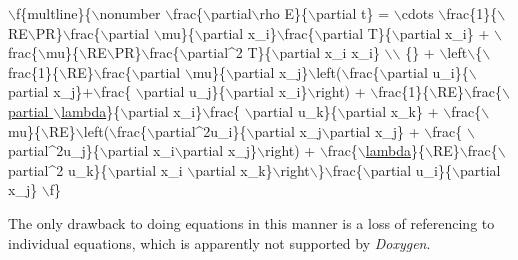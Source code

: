\begin{DoxyCode}
\(\backslash\)f\{multline\}\{\(\backslash\)nonumber
\(\backslash\)frac\{\(\backslash\)partial\(\backslash\)rho E\}\{\(\backslash\)partial t\} = \(\backslash\)cdots \(\backslash\)frac\{1\}\{\(\backslash\)RE\(\backslash\)PR\}\(\backslash\)frac\{\(\backslash\)partial \(\backslash\)mu\}\{\(\backslash\)partial x\_i\}\(\backslash\)frac\{\(\backslash\)partial 
      T\}\{\(\backslash\)partial x\_i\} + \(\backslash\)frac\{\(\backslash\)mu\}\{\(\backslash\)RE\(\backslash\)PR\}\(\backslash\)frac\{\(\backslash\)partial^2 T\}\{\(\backslash\)partial x\_i x\_i\} \(\backslash\)\(\backslash\)
\{\} + \(\backslash\)left\(\backslash\)\{\(\backslash\)frac\{1\}\{\(\backslash\)RE\}\(\backslash\)frac\{\(\backslash\)partial \(\backslash\)mu\}\{\(\backslash\)partial x\_j\}\(\backslash\)left(\(\backslash\)frac\{\(\backslash\)partial u\_i\}\{\(\backslash\)partial x\_j\}+\(\backslash\)frac\{
      \(\backslash\)partial u\_j\}\{\(\backslash\)partial x\_i\}\(\backslash\)right) + \(\backslash\)frac\{1\}\{\(\backslash\)RE\}\(\backslash\)frac\{\hyperlink{RoeKernels_8H_a89211c91f7e80725e4791ef58e043244}{\(\backslash\)partial \(\backslash\)lambda}\}\{\(\backslash\)partial x\_i\}\(\backslash\)frac\{
      \(\backslash\)partial u\_k\}\{\(\backslash\)partial x\_k\} + \(\backslash\)frac\{\(\backslash\)mu\}\{\(\backslash\)RE\}\(\backslash\)left(\(\backslash\)frac\{\(\backslash\)partial^2u\_i\}\{\(\backslash\)partial x\_j\(\backslash\)partial x\_j\} + \(\backslash\)frac\{
      \(\backslash\)partial^2u\_j\}\{\(\backslash\)partial x\_i\(\backslash\)partial x\_j\}\(\backslash\)right) + \(\backslash\)frac\{\hyperlink{RoeKernels_8H_a89211c91f7e80725e4791ef58e043244}{\(\backslash\)lambda}\}\{\(\backslash\)RE\}\(\backslash\)frac\{\(\backslash\)partial^2 u\_k\}\{\(\backslash\)partial x\_i
       \(\backslash\)partial x\_k\}\(\backslash\)right\(\backslash\)\}\(\backslash\)frac\{\(\backslash\)partial u\_i\}\{\(\backslash\)partial x\_j\}
\(\backslash\)f\}
\end{DoxyCode}


The only drawback to doing equations in this manner is a loss of referencing to individual equations, which is apparently not supported by {\itshape Doxygen}. 